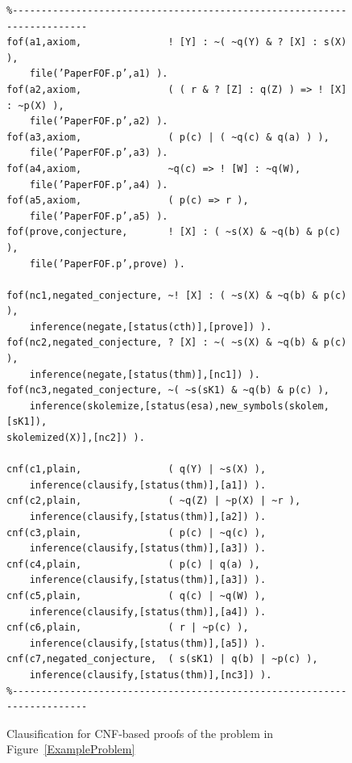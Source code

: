 \documentclass{ceurart}
\begin{document}
\begin{figure}[htb]
\centering
{\footnotesize
{\setlength{\baselineskip}{4mm}
\begin{verbatim}
%------------------------------------------------------------------------
fof(a1,axiom,               ! [Y] : ~( ~q(Y) & ? [X] : s(X) ),
    file(’PaperFOF.p’,a1) ).
fof(a2,axiom,               ( ( r & ? [Z] : q(Z) ) => ! [X] : ~p(X) ),
    file(’PaperFOF.p’,a2) ).
fof(a3,axiom,               ( p(c) | ( ~q(c) & q(a) ) ),
    file(’PaperFOF.p’,a3) ).
fof(a4,axiom,               ~q(c) => ! [W] : ~q(W),
    file(’PaperFOF.p’,a4) ).
fof(a5,axiom,               ( p(c) => r ),
    file(’PaperFOF.p’,a5) ).
fof(prove,conjecture,       ! [X] : ( ~s(X) & ~q(b) & p(c) ),
    file(’PaperFOF.p’,prove) ).

fof(nc1,negated_conjecture, ~! [X] : ( ~s(X) & ~q(b) & p(c) ),
    inference(negate,[status(cth)],[prove]) ).
fof(nc2,negated_conjecture, ? [X] : ~( ~s(X) & ~q(b) & p(c) ),
    inference(negate,[status(thm)],[nc1]) ).
fof(nc3,negated_conjecture, ~( ~s(sK1) & ~q(b) & p(c) ),
    inference(skolemize,[status(esa),new_symbols(skolem,[sK1]),
skolemized(X)],[nc2]) ).

cnf(c1,plain,               ( q(Y) | ~s(X) ),
    inference(clausify,[status(thm)],[a1]) ).
cnf(c2,plain,               ( ~q(Z) | ~p(X) | ~r ),
    inference(clausify,[status(thm)],[a2]) ).
cnf(c3,plain,               ( p(c) | ~q(c) ),
    inference(clausify,[status(thm)],[a3]) ).
cnf(c4,plain,               ( p(c) | q(a) ),
    inference(clausify,[status(thm)],[a3]) ).
cnf(c5,plain,               ( q(c) | ~q(W) ),
    inference(clausify,[status(thm)],[a4]) ).
cnf(c6,plain,               ( r | ~p(c) ),
    inference(clausify,[status(thm)],[a5]) ).
cnf(c7,negated_conjecture,  ( s(sK1) | q(b) | ~p(c) ),
    inference(clausify,[status(thm)],[nc3]) ).
%------------------------------------------------------------------------
\end{verbatim}
}}
\caption{Clausification for CNF-based proofs of the problem in Figure~\ref{ExampleProblem}}
\label{ExampleClausification}
\end{figure}
\end{document}
